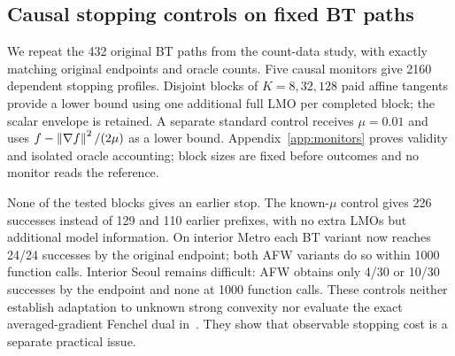 \subsection{Causal stopping controls on fixed BT paths}
We repeat the 432 original BT paths from the count-data study, with
exactly matching original endpoints and oracle counts. Five causal
monitors give 2160 dependent stopping profiles. Disjoint blocks of
$K=8,32,128$ paid affine tangents provide a lower bound using one
additional full LMO per completed block; the scalar envelope is
retained. A separate standard control receives $\mu=0.01$ and uses
$f-\left\|\nabla f\right\|^2/(2\mu)$ as a lower bound. Appendix~\ref{app:monitors}
proves validity and isolated oracle accounting; block sizes are fixed
before outcomes and no monitor reads the reference.


None of the tested blocks gives an earlier stop. The known-$\mu$
control gives 226 successes instead of 129 and 110 earlier prefixes,
with no extra LMOs but additional model information. On interior
Metro each BT variant now reaches 24/24 successes by the original
endpoint; both AFW variants do so within 1000 function calls.
Interior Seoul remains difficult: AFW obtains only 4/30 or 10/30
successes by the endpoint and none at 1000 function calls.
These controls neither establish adaptation to unknown strong convexity
nor evaluate the exact averaged-gradient Fenchel dual in~\cite{pedregosa}.
They show that observable stopping cost is a separate practical issue.
